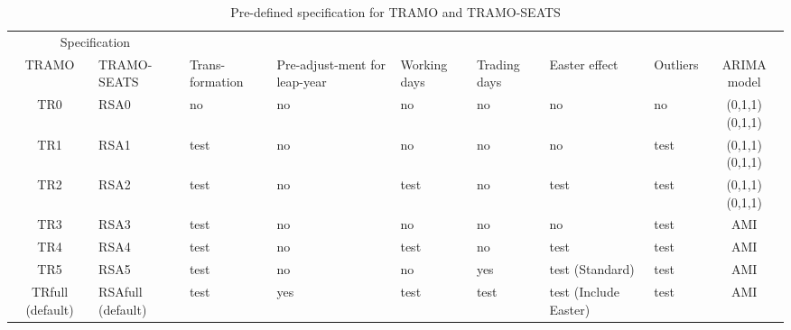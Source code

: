 \documentclass[article]{jss}
\begin{document}
\begin{table}

\caption{\label{tab:pre_def_ts}Pre-defined specification for TRAMO and TRAMO-SEATS}
\centering
\fontsize{7}{9}\selectfont
\begin{tabular}[t]{c>{\centering\arraybackslash}p{}>{\centering\arraybackslash}p{}>{\centering\arraybackslash}p{1.5cm}>{\centering\arraybackslash}p{0.9cm}>{\centering\arraybackslash}p{0.9cm}>{\centering\arraybackslash}p{1.5cm}>{\centering\arraybackslash}p{0.9cm}c}
\toprule
\multicolumn{2}{c}{Specification} & \multicolumn{1}{c}{} \\
\cmidrule(l{2pt}r{2pt}){1-2}
TRAMO & TRAMO-SEATS & Trans-formation & Pre-adjust-ment for leap-year & Working days & Trading days & Easter effect & Outliers & ARIMA model\\
\midrule
TR0 & RSA0 & no & no & no & no & no & no & (0,1,1)(0,1,1)\\
TR1 & RSA1 & test & no & no & no & no & test & (0,1,1)(0,1,1)\\
TR2 & RSA2 & test & no & test & no & test & test & (0,1,1)(0,1,1)\\
TR3 & RSA3 & test & no & no & no & no & test & AMI\\
TR4 & RSA4 & test & no & test & no & test & test & AMI\\
\addlinespace
TR5 & RSA5 & test & no & no & yes & test (Standard) & test & AMI\\
TRfull (default) & RSAfull (default) & test & yes & test & test & test (Include Easter) & test & AMI\\
\bottomrule
\end{tabular}
\end{table}
\end{document}
